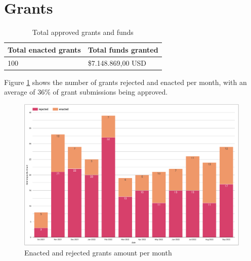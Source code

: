 \documentclass[MSE,Master,english]{twbook}%
\begin{document}
\section{Grants}
\begin{center}
  \begin{table}[H]
    \begin{tabular}{ | m{20em} | m{20em} | }
      \hline
      \textbf{Total enacted grants} & \textbf{Total funds granted} \\
      \hline
      100 & \$7.148.869,00 USD \\
      \hline
    \end{tabular}
    \caption{Total approved grants and funds}
    \label{table:grants}
  \end{table}
\end{center}

Figure \ref{fig:grants_amount} shows the number of grants rejected and enacted per month, with an average of 36\% of grant submissions being approved.
\begin{figure}[H]
  \centering
  \includegraphics[width=\textwidth]{metrics/grants_amount.png}
  \caption{Enacted and rejected grants amount per month}
  \label{fig:grants_amount}
\end{figure}
\end{document}
